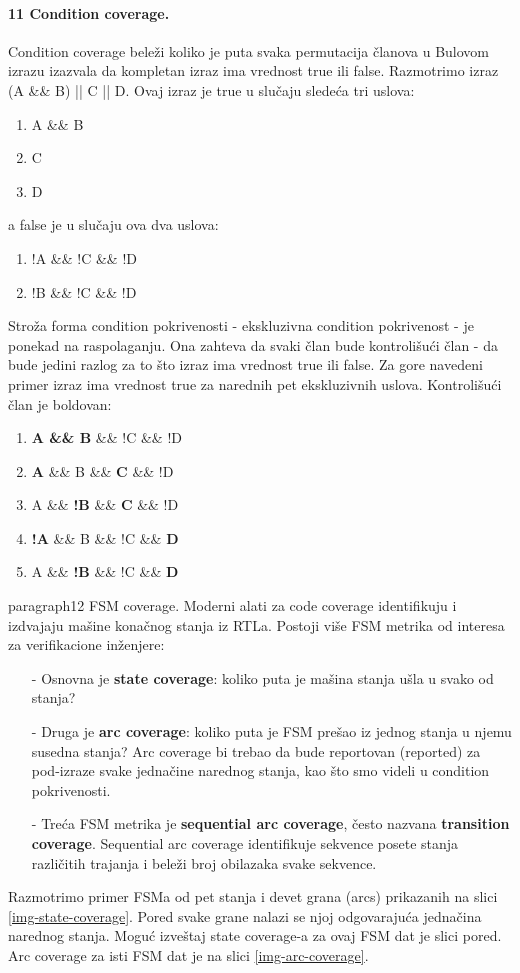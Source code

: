 \documentclass[a4paper, 12pt]{article}
\begin{document}
\paragraph{11 Condition coverage.}
\hfill \break
\indent Condition coverage beleži koliko je puta svaka permutacija članova u Bulovom izrazu izazvala da kompletan izraz ima vrednost true ili false. Razmotrimo izraz (A \&\& B) || C || D. Ovaj izraz je true u slučaju sledeća tri uslova:
\begin{enumerate}
\item A \&\& B
\item C
\item D
\end{enumerate}
a false je u slučaju ova dva uslova:
\begin{enumerate}
\item !A \&\& !C \&\& !D
\item !B \&\& !C \&\& !D
\end{enumerate}
\indent Stroža forma condition pokrivenosti - ekskluzivna condition pokrivenost - je ponekad na raspolaganju. Ona zahteva da svaki član bude kontrolišući član - da bude jedini razlog za to što izraz ima vrednost true ili false. Za gore navedeni primer izraz ima vrednost true za narednih pet ekskluzivnih uslova. Kontrolišući član je boldovan:
\begin{enumerate}
\item \textbf{A \&\& B} \&\& !C \&\& !D
\item \textbf{A} \&\& B \&\& \textbf{C} \&\& !D
\item A \&\& \textbf{!B} \&\& \textbf{C} \&\& !D
\item \textbf{!A} \&\& B \&\& !C \&\& \textbf{D}
\item A \&\& \textbf{!B} \&\& !C \&\& \textbf{D}
\end{enumerate}
paragraph{12 FSM coverage.}
\hfill \break
\indent Moderni alati za code coverage identifikuju i izdvajaju mašine konačnog stanja iz RTLa. Postoji više FSM metrika od interesa za verifikacione inženjere:
\begin{itemize}
\item[-] Osnovna je \textbf{state coverage}: koliko puta je mašina stanja ušla u svako od stanja?
\item[-] Druga je \textbf{arc coverage}: koliko puta je FSM prešao iz jednog stanja u njemu susedna stanja? Arc coverage bi trebao da bude reportovan (reported) za pod-izraze svake jednačine narednog stanja, kao što smo videli u condition pokrivenosti.
\item[-] Treća FSM metrika je \textbf{sequential arc coverage}, često nazvana \textbf{transition coverage}. Sequential arc coverage identifikuje sekvence posete stanja različitih trajanja i beleži broj obilazaka svake sekvence.
\end{itemize}
\indent Razmotrimo primer FSMa od pet stanja i devet grana (arcs) prikazanih na slici \ref{img-state-coverage}. Pored svake grane nalazi se njoj odgovarajuća jednačina narednog stanja. Moguć izveštaj state coverage-a za ovaj FSM dat je slici pored.\\
\indent Arc coverage za isti FSM dat je na slici \ref{img-arc-coverage}.\\
\end{document}
